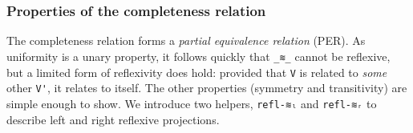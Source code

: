 \documentclass[authoryear, acmsmall, screen, review, nonacm]{acmart}
\begin{document}
\begin{code}
\AgdaCatchallClause{\AgdaSymbol{=}}\AgdaSpace{}%
\AgdaCatchallClause{\AgdaOperator{\AgdaInductiveConstructor{R[}}}\AgdaSpace{}%
\AgdaSpace{}%
\AgdaCatchallClause{\AgdaOperator{\AgdaInductiveConstructor{]}}}\AgdaCatchallClause{\AgdaSymbol{\}}}\AgdaSpace{}%
\AgdaCatchallClause{\AgdaSymbol{(}}\AgdaSpace{}%
\AgdaCatchallClause{\AgdaSymbol{\AgdaUnderscore{})}}\AgdaSpace{}%
\AgdaCatchallClause{\AgdaSymbol{(}}\AgdaSpace{}%
\AgdaCatchallClause{\AgdaSymbol{\AgdaUnderscore{})}}%
\>[67]\AgdaSymbol{=}\AgdaSpace{}%
\<%
\\
\>[0]\AgdaSpace{}%
\AgdaCatchallClause{\AgdaSymbol{\{}}\AgdaSpace{}%
\AgdaCatchallClause{\AgdaSymbol{=}}\AgdaSpace{}%
\AgdaCatchallClause{\AgdaOperator{\AgdaInductiveConstructor{R[}}}\AgdaSpace{}%
\AgdaSpace{}%
\AgdaCatchallClause{\AgdaOperator{\AgdaInductiveConstructor{]}}}\AgdaCatchallClause{\AgdaSymbol{\}}}\AgdaSpace{}%
\AgdaCatchallClause{\AgdaSymbol{(}}\AgdaSpace{}%
\AgdaCatchallClause{\AgdaSymbol{\AgdaUnderscore{})}}\AgdaSpace{}%
%
\>[67]\AgdaSymbol{=}\AgdaSpace{}%
\<%
\\
\>[0]\AgdaSpace{}%
\AgdaSymbol{\{}\AgdaSpace{}%
\AgdaSymbol{=}\AgdaSpace{}%
\AgdaOperator{\AgdaInductiveConstructor{R[}}\AgdaSpace{}%
\AgdaSpace{}%
\AgdaOperator{\AgdaInductiveConstructor{]}}\AgdaSymbol{\}}\AgdaSpace{}%
\AgdaSpace{}%
\AgdaSymbol{(}\AgdaSpace{}%
\AgdaSymbol{\AgdaUnderscore{})}%
\>[67]\AgdaSymbol{=}\AgdaSpace{}%
\<%
\end{code}


\subsubsection{Properties of the completeness relation}

The completeness relation forms a \emph{partial equivalence relation} (PER). As uniformity is a unary property, it follows quickly that \verb!_≋_! cannot be reflexive, but a limited form of reflexivity does hold: provided that \verb!V! is related to \emph{some} other \verb!V'!, it relates to itself. The other properties (symmetry and transitivity) are simple enough to show. We introduce two helpers, \verb!refl-≋ₗ! and \verb!refl-≋ᵣ! to describe left and right reflexive projections.
\end{document}
